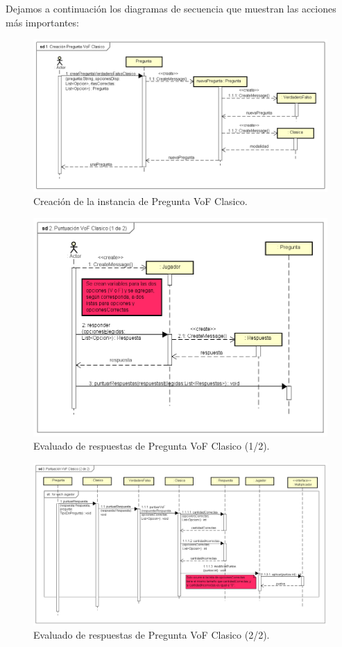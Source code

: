 \documentclass[titlepage,a4paper]{article}
\begin{document}
Dejamos a continuación los diagramas de secuencia que muestran las acciones más importantes:

\begin{figure}[H]
\centering
\includegraphics[width=1\textwidth]{img/UMLSeq2.png}
\caption{\label{fig:class01}Creación de la instancia de Pregunta VoF Clasico.}
\end{figure}

\begin{figure}[H]
\centering
\includegraphics[width=1\textwidth]{img/UMLSeq3.png}
\caption{\label{fig:class01}Evaluado de respuestas de Pregunta VoF Clasico (1/2).}
\end{figure}

\begin{figure}[H]
\centering
\includegraphics[width=1\textwidth]{img/UMLSeq4.png}
\caption{\label{fig:class01}Evaluado de respuestas de Pregunta VoF Clasico (2/2).}
\end{figure}
\end{document}
